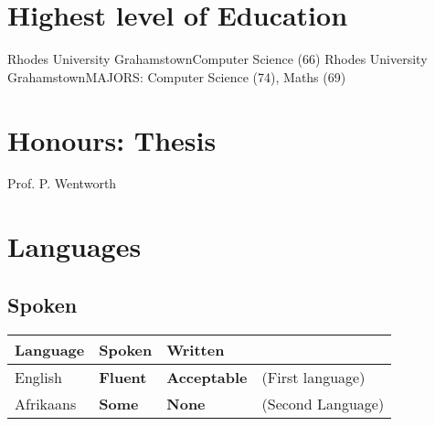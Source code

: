 \documentclass[11pt,a4paper,sans]{moderncv} %
\begin{document}
\makecvtitle %


\section{Highest level of Education}
	{Rhodes University}			{Grahamstown}{\textit{}}{Computer Science (66)}
						{Rhodes University} 		{Grahamstown}{\textit{}}{MAJORS: Computer Science (74), Maths (69)}

\section{Honours: Thesis}
 {Prof. P. Wentworth}



\section{Languages}
\subsection{Spoken}
\begin{tabular}{p{4cm} p{4cm} p{5cm} p{5cm} }
 Language   & Spoken    		& Written 				& \\
 \hline
 English  	& \textbf{Fluent} 	& \textbf{Acceptable} 	& (First language) \\
 Afrikaans  & \textbf{Some} 	& \textbf{None} 		& (Second Language)\\
\end{tabular}
\end{document}
